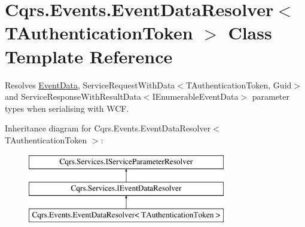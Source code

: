 \hypertarget{classCqrs_1_1Events_1_1EventDataResolver}{}\section{Cqrs.\+Events.\+Event\+Data\+Resolver$<$ T\+Authentication\+Token $>$ Class Template Reference}
\label{classCqrs_1_1Events_1_1EventDataResolver}


Resolves \hyperlink{classCqrs_1_1Events_1_1EventData}{Event\+Data}, Service\+Request\+With\+Data$<$\+T\+Authentication\+Token, Guid$>$ and Service\+Response\+With\+Result\+Data$<$\+I\+Enumerable\+Event\+Data$>$ parameter types when serialising with W\+CF.  


Inheritance diagram for Cqrs.\+Events.\+Event\+Data\+Resolver$<$ T\+Authentication\+Token $>$\+:\begin{figure}[H]
\begin{center}
\leavevmode
\includegraphics[height=3.000000cm]{classCqrs_1_1Events_1_1EventDataResolver}
\end{center}
\end{figure}
